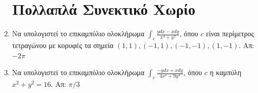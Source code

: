 \begin{enumerate}
    

    \section*{Πολλαπλά Συνεκτικό Χωρίο}

  \item Να υπολογιστεί το επικαμπύλιο ολοκλήρωμα $ \int _{c}
    \frac{ydx-xdy}{x^{2}+y^{2}} $, όπου $ c $ είναι περίμετρος τετραγώνου με κορυφές τα
    σημεία $(1,1), (-1,1), (-1,-1), (1,-1) $. \hfill Απ: $ -2 \pi $ 

  \item Να υπολογιστεί το επικαμπύλιο ολοκλήρωμα $ \int _{c}
    \frac{-ydx+xdy}{4x^{2}+9y^{2}} $, όπου $ c $ η καμπύλη $ x^{2}+y^{2}=16 $.
    \hfill Απ: $ \pi /3 $ 
\end{enumerate}








